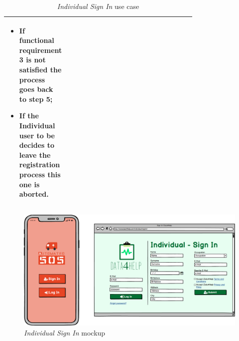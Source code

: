 \begin{center}
\begin{table}
\begin{tabular}{ | l | p{0.75\linewidth} | }
\begin{minipage}[t]{0.7\textwidth}
\begin{itemize}
      \item If functional requirement 3 is not satisfied the process goes back to step 5;
      \item If the \textbf{Individual user to be} decides to leave the registration process this one is aborted.
    \end{itemize}
    \smallskip
  \end{minipage}  \\ \hline
\end{tabular}
\caption{\textit{Individual Sign In} use case}
\label{table:individualSignInTable}
\end{table}
\end{center}
\clearpage

\begin{figure}
\begin{center}
  \includegraphics[width=\textwidth]{img/mockup/Individual_SingIn.png}
  \hspace{0.05\linewidth}
  \centering
  \caption{\textit{Individual Sign In} mockup}
  \label{img:individualSignInMockup}
\end{center}
\end{figure}
